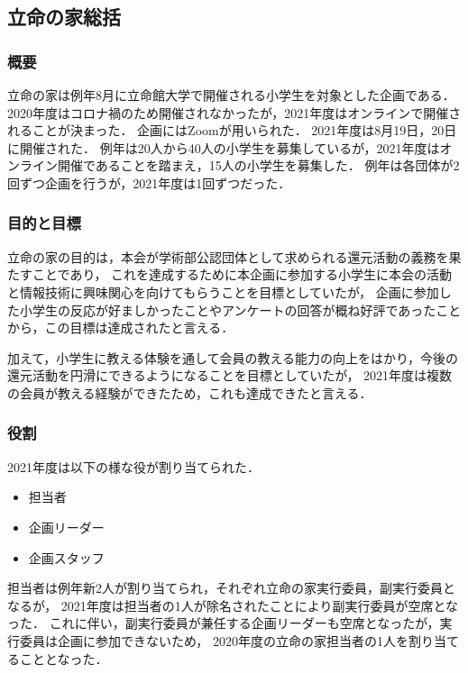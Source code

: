 \subsection*{立命の家総括}


\subsubsection*{概要}
立命の家は例年8月に立命館大学で開催される小学生を対象とした企画である．
2020年度はコロナ禍のため開催されなかったが，2021年度はオンラインで開催されることが決まった．
企画にはZoomが用いられた．
2021年度は8月19日，20日に開催された．
例年は20人から40人の小学生を募集しているが，2021年度はオンライン開催であることを踏まえ，15人の小学生を募集した．
例年は各団体が2回ずつ企画を行うが，2021年度は1回ずつだった．

\subsubsection*{目的と目標}
立命の家の目的は，本会が学術部公認団体として求められる還元活動の義務を果たすことであり，
これを達成するために本企画に参加する小学生に本会の活動と情報技術に興味関心を向けてもらうことを目標としていたが，
企画に参加した小学生の反応が好ましかったことやアンケートの回答が概ね好評であったことから，この目標は達成されたと言える．

加えて，小学生に教える体験を通して会員の教える能力の向上をはかり，今後の還元活動を円滑にできるようになることを目標としていたが，
2021年度は複数の会員が教える経験ができたため，これも達成できたと言える．

\subsubsection*{役割}
2021年度は以下の様な役が割り当てられた．
\begin{itemize}
  \item 担当者
  \item 企画リーダー
  \item 企画スタッフ
\end{itemize}
担当者は例年新\secondGrade{}2人が割り当てられ，それぞれ立命の家実行委員，副実行委員となるが，
2021年度は担当者の1人が除名されたことにより副実行委員が空席となった．
これに伴い，副実行委員が兼任する企画リーダーも空席となったが，実行委員は企画に参加できないため，
2020年度の立命の家担当者の1人を割り当てることとなった．

